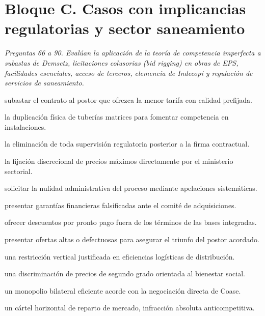 \section*{Bloque C. Casos con implicancias regulatorias y sector saneamiento}

\noindent\textit{Preguntas 66 a 90. Evalúan la aplicación de la teoría de competencia imperfecta a subastas de Demsetz, licitaciones colusorias (bid rigging) en obras de EPS, facilidades esenciales, acceso de terceros, clemencia de Indecopi y regulación de servicios de saneamiento.}

\begin{opts}
    \item subastar el contrato al postor que ofrezca la menor tarifa con calidad prefijada.
    \item la duplicación física de tuberías matrices para fomentar competencia en instalaciones.
    \item la eliminación de toda supervisión regulatoria posterior a la firma contractual.
    \item la fijación discrecional de precios máximos directamente por el ministerio sectorial.
\end{opts}

\begin{opts}
    \item solicitar la nulidad administrativa del proceso mediante apelaciones sistemáticas.
    \item presentar garantías financieras falsificadas ante el comité de adquisiciones.
    \item ofrecer descuentos por pronto pago fuera de los términos de las bases integradas.
    \item presentar ofertas altas o defectuosas para asegurar el triunfo del postor acordado.
\end{opts}

\begin{opts}
    \item una restricción vertical justificada en eficiencias logísticas de distribución.
    \item una discriminación de precios de segundo grado orientada al bienestar social.
    \item un monopolio bilateral eficiente acorde con la negociación directa de Coase.
    \item un cártel horizontal de reparto de mercado, infracción absoluta anticompetitiva.
\end{opts}

